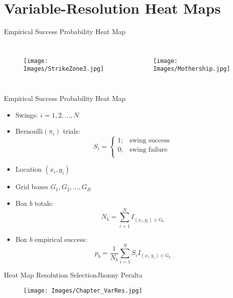 \documentclass{beamer}
\def\bdm{\begin{displaymath}}
\def\edm{\end{displaymath}}
\begin{document}
\section{Variable-Resolution Heat Maps}

\begin{frame}{Empirical Success Probability Heat Map} %
\begin{columns}


  \begin{figure}[H]
	\centering
	\texttt{[image: Images/StrikeZone3.jpg]}
	\end{figure}

  \begin{figure}[H]
	\centering
	\texttt{[image: Images/Mothership.jpg]}
	\end{figure}

\end{columns}
\end{frame}

\begin{frame}{Empirical Success Probability Heat Map} %

\begin{itemize}
\addtolength{\itemsep}{0.5\baselineskip}
\item Swings: $i = 1,2,\ldots, N$
\item $\text{Bernoulli}(\pi_{i})$ trials:
    \bdm
    S_i = \left\{\begin{array}{ll} 1; & \mbox{swing success} \\
    					 0; & \mbox{swing failure} \\ \end{array} \right.
    \edm
\item Location $(x_i,y_i)$
\item Grid boxes $G_1,G_2,\ldots,G_B$
\item Box $b$ totals:
    \bdm
    N_b = \sum_{i=1}^N I_{(x_i,y_i) \in G_b}
    \edm
\item Box $b$ empirical success:
    \bdm
     p_b = \frac{1}{N_b} \sum_{i=1}^N S_i I_{(x_i,y_i) \in G_b}
    \edm
\end{itemize}
\end{frame}

\begin{frame}{Heat Map Resolution Selection}{Jhonny Peralta}
  \begin{figure}[H]
	\centering
	\texttt{[image: Images/Chapter\_VarRes.jpg]}
	\end{figure}
\end{frame}
\end{document}
